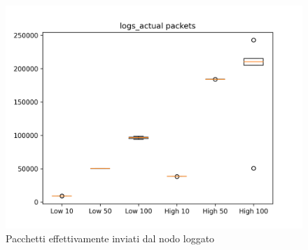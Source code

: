 \documentclass[12pt, a4paper]{article}
\begin{document}
\begin{figure}[H]
    \includegraphics[width=\linewidth, height=0.4\textheight, keepaspectratio]{graphs/logs_actual packets.png}
    \caption{Pacchetti effettivamente inviati dal nodo loggato}
    \label{fig:lap}
\end{figure}
\end{document}
